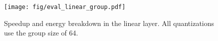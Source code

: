 \begin{figure}[t] 
    \centering 
    \texttt{[image: fig/eval\_linear\_group.pdf]}  
    \caption{Speedup and energy breakdown in the linear layer. All quantizations use the group size of 64.} 
    \label{fig:lieanr_group}
  \end{figure}